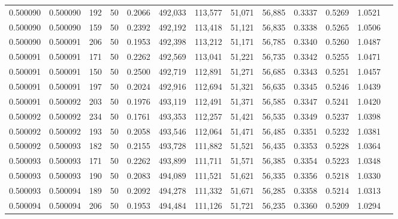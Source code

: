 \begin{tabular}{rrrrrrrrrrrrr}
0.500090 & 0.500090 &   192 &  50 &                                     0.2066 & 492,033 & 113,577 &  51,071 &  56,885 & 0.3337 & 0.5269 & 1.0521 \\
0.500090 & 0.500090 &   159 &  50 &                                     0.2392 & 492,192 & 113,418 &  51,121 &  56,835 & 0.3338 & 0.5265 & 1.0506 \\
0.500090 & 0.500091 &   206 &  50 &                                     0.1953 & 492,398 & 113,212 &  51,171 &  56,785 & 0.3340 & 0.5260 & 1.0487 \\
0.500091 & 0.500091 &   171 &  50 &                                     0.2262 & 492,569 & 113,041 &  51,221 &  56,735 & 0.3342 & 0.5255 & 1.0471 \\
0.500091 & 0.500091 &   150 &  50 &                                     0.2500 & 492,719 & 112,891 &  51,271 &  56,685 & 0.3343 & 0.5251 & 1.0457 \\
0.500091 & 0.500091 &   197 &  50 &                                     0.2024 & 492,916 & 112,694 &  51,321 &  56,635 & 0.3345 & 0.5246 & 1.0439 \\
0.500091 & 0.500092 &   203 &  50 &                                     0.1976 & 493,119 & 112,491 &  51,371 &  56,585 & 0.3347 & 0.5241 & 1.0420 \\
0.500092 & 0.500092 &   234 &  50 &                                     0.1761 & 493,353 & 112,257 &  51,421 &  56,535 & 0.3349 & 0.5237 & 1.0398 \\
0.500092 & 0.500092 &   193 &  50 &                                     0.2058 & 493,546 & 112,064 &  51,471 &  56,485 & 0.3351 & 0.5232 & 1.0381 \\
0.500092 & 0.500093 &   182 &  50 &                                     0.2155 & 493,728 & 111,882 &  51,521 &  56,435 & 0.3353 & 0.5228 & 1.0364 \\
0.500093 & 0.500093 &   171 &  50 &                                     0.2262 & 493,899 & 111,711 &  51,571 &  56,385 & 0.3354 & 0.5223 & 1.0348 \\
0.500093 & 0.500093 &   190 &  50 &                                     0.2083 & 494,089 & 111,521 &  51,621 &  56,335 & 0.3356 & 0.5218 & 1.0330 \\
0.500093 & 0.500094 &   189 &  50 &                                     0.2092 & 494,278 & 111,332 &  51,671 &  56,285 & 0.3358 & 0.5214 & 1.0313 \\
0.500094 & 0.500094 &   206 &  50 &                                     0.1953 & 494,484 & 111,126 &  51,721 &  56,235 & 0.3360 & 0.5209 & 1.0294 \\

\end{tabular}
